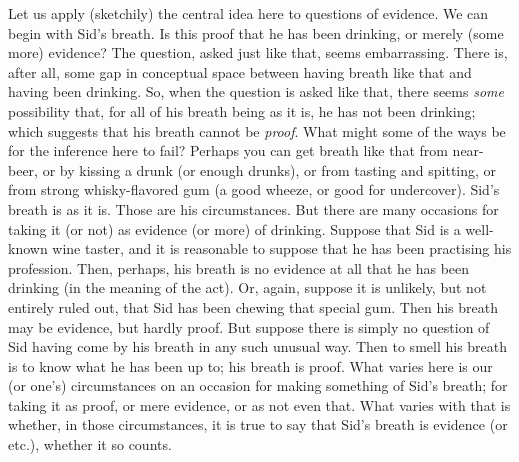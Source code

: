 Let us apply (sketchily) the central idea here to questions of evidence. We can begin with Sid’s breath. Is this proof that he has been drinking, or merely (some more) evidence? The question, asked just like that, seems embarrassing. There is, after all, some gap in conceptual space between having breath like that and having been drinking. So, when the question is asked like that, there seems \emph{some} possibility that, for all of his breath being as it is, he has not been drinking; which suggests that his breath cannot be \emph{proof}. What might some of the ways be for the inference here to fail? Perhaps you can get breath like that from near-beer, or by kissing a drunk (or enough drunks), or from tasting and spitting, or from strong whisky-flavored gum (a good wheeze, or good for undercover). Sid's breath is as it is. Those are his circumstances. But there are many occasions for taking it (or not) as evidence (or more) of drinking. Suppose that Sid is a well-known wine taster, and it is reasonable to suppose that he has been practising his profession. Then, perhaps, his breath is no evidence at all that he has been drinking (in the meaning of the act). Or, again, suppose it is unlikely, but not entirely ruled out, that Sid has been chewing that special gum. Then his breath may be evidence, but hardly proof. But suppose there is simply no question of Sid having come by his breath in any such unusual way. Then to smell his breath is to know what he has been up to; his breath is proof. What varies here is our (or one's) circumstances on an occasion for making something of Sid's breath; for taking it as proof, or mere evidence, or as not even that. What varies with that is whether, in those circumstances, it is true to say that Sid's breath is evidence (or etc.), whether it so counts.

